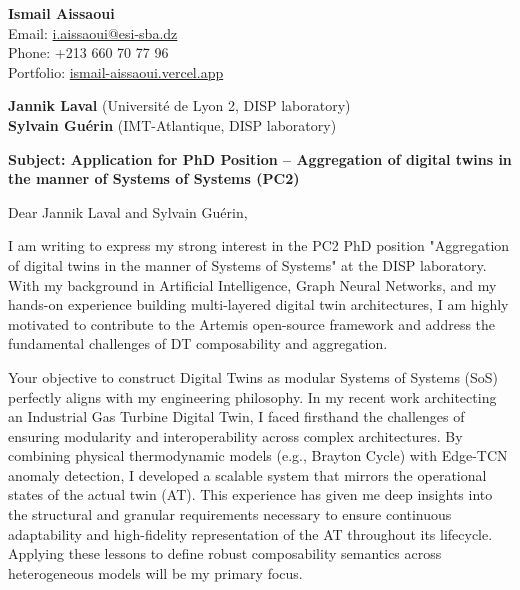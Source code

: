 \documentclass[11pt,a4paper]{article}
\begin{document}
\thispagestyle{empty}

\begin{flushright}
\textbf{Ismail Aissaoui} \\
Email: \href{mailto:i.aissaoui@esi-sba.dz}{i.aissaoui@esi-sba.dz} \\
Phone: +213 660 70 77 96 \\
Portfolio: \href{https://ismail-aissaoui.vercel.app}{ismail-aissaoui.vercel.app}
\end{flushright}

\vspace{1em}

\begin{flushleft}
\textbf{Jannik Laval} (Université de Lyon 2, DISP laboratory) \\
\textbf{Sylvain Guérin} (IMT-Atlantique, DISP laboratory)
\end{flushleft}

\vspace{1em}
\noindent\textbf{Subject: Application for PhD Position -- Aggregation of digital twins in the manner of Systems of Systems (PC2)}
\vspace{1em}

\noindent Dear Jannik Laval and Sylvain Guérin,

\vspace{1em}
\noindent
I am writing to express my strong interest in the PC2 PhD position "Aggregation of digital twins in the manner of Systems of Systems" at the DISP laboratory. With my background in Artificial Intelligence, Graph Neural Networks, and my hands-on experience building multi-layered digital twin architectures, I am highly motivated to contribute to the Artemis open-source framework and address the fundamental challenges of DT composability and aggregation.

\vspace{0.5em}
\noindent
Your objective to construct Digital Twins as modular Systems of Systems (SoS) perfectly aligns with my engineering philosophy. In my recent work architecting an Industrial Gas Turbine Digital Twin, I faced firsthand the challenges of ensuring modularity and interoperability across complex architectures. By combining physical thermodynamic models (e.g., Brayton Cycle) with Edge-TCN anomaly detection, I developed a scalable system that mirrors the operational states of the actual twin (AT). This experience has given me deep insights into the structural and granular requirements necessary to ensure continuous adaptability and high-fidelity representation of the AT throughout its lifecycle. Applying these lessons to define robust composability semantics across heterogeneous models will be my primary focus.
\end{document}
